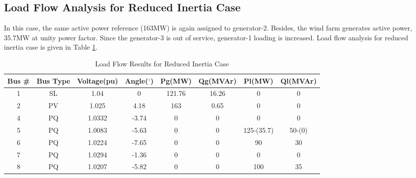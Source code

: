\subsection{Load Flow Analysis for Reduced Inertia Case}
In this case, the same active power reference (163MW) is again assigned to generator-2. Besides, the wind farm generates active power, 35.7MW at unity power factor. Since the generator-3 is out of service, generator-1 loading is increased. Load flow analysis for reduced inertia case is given in Table \ref{loadflow_case3}.
\begin{table}[h!]
	\centering
	\resizebox{\textwidth}{!}
	{
	\begin{tabular}{cclccccc}
		\hline
		Bus \# & Bus Type & \multicolumn{1}{c}{Voltage(pu)} & Angle($^{\circ}$)& Pg(MW)    & Qg(MVAr)     & Pl(MW)  & Ql(MVAr)   \\ \hline
		1      & SL       & \multicolumn{1}{c}{1.04}    & 0     & 121.76& 16.26  & 0   & 0  \\
		2      & PV       & \multicolumn{1}{c}{1.025}   & 4.18  & 163   & 0.65   & 0   & 0  \\
		4      & PQ       & \multicolumn{1}{c}{1.0332}                      & -3.74 & 0     & 0      & 0   & 0  \\
		5      & PQ       & \multicolumn{1}{c}{1.0083}                      & -5.63 & 0     & 0      & 125-(35.7) & 50-(0)\\
		6      & PQ       & \multicolumn{1}{c}{1.0224}                      & -7.65 & 0     & 0      & 90  & 30 \\
		7      & PQ       & \multicolumn{1}{c}{1.0294}                      & -1.36 & 0     & 0      & 0   & 0  \\
		8      & PQ       & \multicolumn{1}{c}{1.0207}                      & -5.82 & 0     & 0      & 100 & 35 \\
 \hline
	\end{tabular}
}
	\caption{Load Flow Results for Reduced Inertia Case}
	\label{loadflow_case3}
\end{table}
